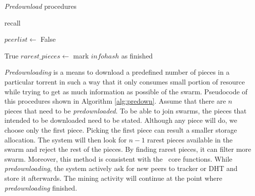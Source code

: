 \begin{algorithm}[h!]
	\caption{\textit{Predownload} procedures}
	\label{alg:predown}
	\begin{algorithmic}[1]
		\State recall 
		\EndIf
		\State {}
		\State {}
		\State {}
		\State \Return {}
		\EndFunction
		
		\Statex
		\State $peerlist \gets$ 
		\State {}
		\State {}
		\State \Return False
		\EndIf
		
		\State {}
		\State {}
		\State \Return True
		\EndIf
		\State $rarest\_pieces \gets$ 
			\State {}
		\EndFor
		\State mark $infohash$ as finished
		\EndIf
		\State \Return {}
		\EndFunction		
	\end{algorithmic}
\end{algorithm}

\textit{Predownloading} is a means to download a predefined number of pieces in a particular torrent in such a way that it only consumes small portion of resource while trying to get as much information as possible of the swarm. Pseudocode of this procedures shown in Algorithm \ref{alg:predown}. Assume that there are $n$ pieces that need to be \textit{predownloaded}. To be able to join swarms, the pieces that intended to be downloaded need to be stated. Although any piece will do, we choose only the first piece. Picking the first piece can result a smaller storage allocation. The system will then look for $n - 1$ rarest pieces available in the swarm and reject the rest of the pieces. By finding rarest pieces, it can filter more swarm. Moreover, this method is consistent with the \bt~core functions. While \textit{predownloading}, the system actively ask for new peers to tracker or DHT and store it afterwards. The mining activity will continue at the point where \textit{predownloading} finished. 

